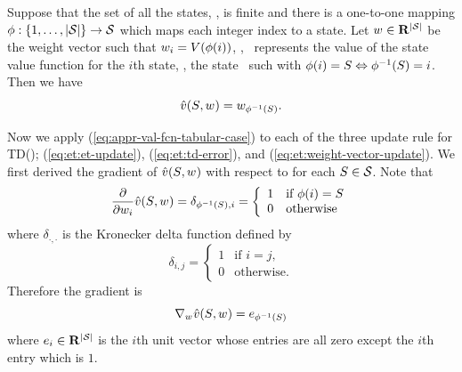 Suppose that the set of all the states, \stateset, is finite
and there is a one-to-one mapping $\phi: \{1,\ldots, {|\mathcal{S}|}\} \to \mathcal{S}$
which maps each integer index to a state.
Let ${w_{}} \in \mathbf{R}^{{|\mathcal{S}|}}$
be the weight vector such that
${w_{i}} = V(\phi(i))$,
\ie, \ represents the value of the state value function for the $i$th state,
\ie, the state \state{}\ such with $\phi(i) = S_{} \Leftrightarrow \phi^{-1}(S_{}) = i$.
Then we have
\begin{equation}
\label{eq:appr-val-fcn-tabular-case}
\hat{v}(S_{}, {w_{}}) = w_{\phi^{-1}(S_{})}.
\end{equation}

Now we apply (\ref{eq:appr-val-fcn-tabular-case}) to each of the three update rule for TD(\tdparam);
(\ref{eq:et:et-update}),
(\ref{eq:et:td-error}),
and
(\ref{eq:et:weight-vector-update}).
We first derived the gradient of $\hat{v}(S_{}, {w_{}})$ with respect to \wvector{}
for each $S_{} \in \mathcal{S}$.
Note that
\begin{equation}
\frac{\partial}{\partial {w_{i}}} \hat{v}(S_{}, {w_{}})
= \delta_{\phi^{-1}(S_{}), i}
= \left\{\begin{array}{ll}
	1 & \mbox{if } \phi(i)= S_{}
	\\
	0 & \mbox{otherwise}
\end{array}\right.
\end{equation}
where $\delta_{\cdot, \cdot}$ is the Kronecker delta function
defined by
\begin{equation}
\delta_{i,j}
= \left\{\begin{array}{ll}
	1 & \mbox{if } i=j,
	\\
	0 & \mbox{otherwise.}
\end{array}\right.
\end{equation}
Therefore the gradient is
\begin{equation}
\label{eq:viskgjh}
\nabla_{{w_{}}} \hat{v}(S_{}, {w_{}}) = e_{\phi^{-1}(S_{})}
\end{equation}
where $e_i\in\mathbf{R}^{|\mathcal{S}|}$ is the $i$th unit vector 
whose entries are all zero except the $i$th entry which is $1$.


